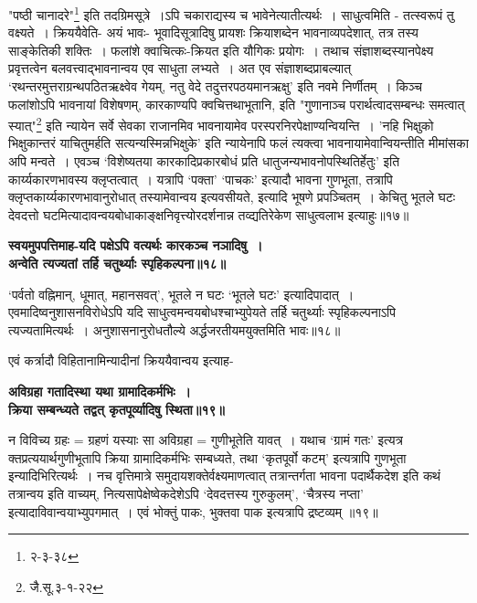 {{"पष्ठी चानादरे"\footnote{२-३-३८} इति तदग्रिमसूत्रे~।ऽपि चकाराद्यस्य च भावेनेत्यातीत्यर्थः~।
 साधुत्वमिति - तत्स्वरूपं तु वक्ष्यते~।
 क्रिययैवेति- अयं भावः- भूवादिसूत्रादिषु प्रायशः क्रियाशब्देन भावनाव्यपदेशात्, तत्र तस्य साङ्केतिकी शक्तिः~।
फलांशे क्वाचित्कः-क्रियत इति यौगिकः प्रयोगः~।
तथाच संज्ञाशब्दस्यानपेक्ष्य प्रवृत्तत्वेन बलवत्त्वाद्भावनान्वय एव साधुता लभ्यते~।
अत एव संज्ञाशब्दप्राबल्यात् `रथन्तरमुत्तराग्रन्थपठितऋक्ष्वेव गेयम्, नतु वेदे तदुत्तरपठयमानऋक्षु' इति नवमे निर्णीतम्~।
 किञ्च फलांशोऽपि भावनायां विशेषणम्, कारकाण्यपि क्वचित्तथाभूतानि, इति "गुणानाञ्च परार्थत्वादसम्बन्धः समत्वात् स्यात्"\footnote{जै.सू.३-१-२२} इति न्यायेन सर्वे सेवका राजानमिव भावनायामेव परस्परनिरपेक्षाण्यन्वियन्ति~।
'नहि भिक्षुको भिक्षुकान्तरं याचितुमर्हति सत्यन्यस्मिन्नभिक्षुके' इति न्यायेनापि फलं त्यक्त्वा भावनायामेवान्वियन्तीति मीमांसका अपि मन्वते~।
एवञ्च `विशेष्यतया कारकादिप्रकारबोधं प्रति धातुजन्यभावनोपस्थितिर्हेतुः' इति कार्य्यकारणभावस्य क्लृप्तत्वात्~।
यत्रापि `पक्ता' `पाचकः' इत्यादौ भावना गुणभूता, तत्रापि क्लृप्तकार्य्यकारणभावानुरोधात् तस्यामेवान्वय इत्यवसीयते, इत्यादि भूषणे प्रपञ्चितम्~।
केचितु भूतले घटः देवदत्तो घटमित्यादावन्वयबोधाकाङ्क्षनिवृत्त्योरदर्शनान्न तव्द्यतिरेकेण साधुत्वलाभ इत्याहुः॥१७॥\par
\begin{center}{\bfseries स्वयमुपपत्तिमाह-यदि पक्षेऽपि वत्यर्थः कारकञ्च नञादिषु~।\\
अन्वेति त्यज्यतां तर्हि चतुर्थ्याः स्पृहिकल्पना॥१८॥}
\end{center}
 `पर्वतो वह्निमान्, धूमात्, महानसवत्', भूतले न घटः `भूतले घटः' इत्यादिपादात्~।
एवमादिष्वनुशासनविरोधेऽपि यदि साधुत्वमन्वयबोधश्चाभ्युपेयते तर्हि चतुर्थ्याः स्पृहिकल्पनाऽपि त्यज्यतामित्यर्थः~।
अनुशासनानुरोधतौल्ये अर्द्धजरतीयमयुक्तमिति भावः॥१८॥\par
 एवं कर्त्रादौ विहितानामिन्यादीनां क्रिययैवान्वय इत्याह-
\begin{center}{\bfseries अविग्रहा गतादिस्था यथा ग्रामादिकर्मभिः~।\\
 क्रिया सम्बन्ध्यते तद्वत् कृतपूर्व्यादिषु स्थिता॥१९॥}
\end{center}
 न विविच्य ग्रहः = ग्रहणं यस्याः सा अविग्रहा = गुणीभूतेति यावत्~।
यथाच `ग्रामं गतः' इत्यत्र क्तप्रत्ययार्थगुणीभूतापि क्रिया ग्रामादिकर्मभिः सम्बध्यते, तथा `कृतपूर्वो कटम्' इत्यत्रापि गुणभूता इन्यादिभिरित्यर्थः~।
 नच वृत्तिमात्रे समुदायशक्तेर्वक्ष्यमाणत्वात् तत्रान्तर्गता भावना पदार्थैकदेश इति कथं तत्रान्वय इति वाच्यम्, नित्यसापेक्षेष्वेकदेशेऽपि `देवदत्तस्य गुरुकुलम्', `चैत्रस्य नप्ता' इत्यादाविवान्वयाभ्युपगमात्~।
एवं भोक्तुं पाकः, भुक्तवा पाक इत्यत्रापि द्रष्टव्यम् ॥१९॥\par
}}

